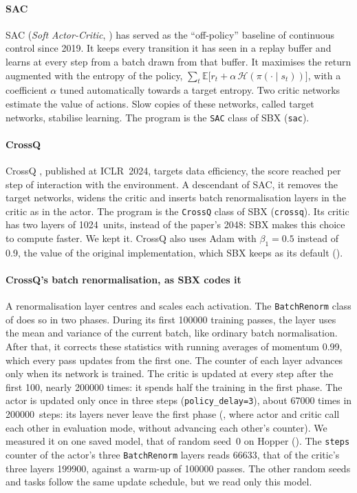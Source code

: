 \paragraph{SAC}
SAC (\emph{Soft Actor-Critic}, \cite{haarnoja2018sac}) has served as the \enquote{off-policy} baseline of
continuous control since 2019. It keeps every transition it has seen in a replay buffer and learns at every step from a
batch drawn from that buffer. It maximises the return augmented with the entropy of the policy,
$\sum_t \mathbb{E}\bigl[r_t + \alpha\,\mathcal{H}(\pi(\cdot\mid s_t))\bigr]$, with a coefficient $\alpha$
tuned automatically towards a target entropy. Two critic networks estimate the value of actions. Slow copies of
these networks, called target networks, stabilise learning. The program is the \texttt{SAC} class of SBX
(\texttt{sac}).

\paragraph{CrossQ}
CrossQ \parencite{bhatt2024crossq}, published at ICLR~2024, targets data efficiency, the score reached per step
of interaction with the environment. A descendant of SAC, it removes the target networks, widens the critic
and inserts batch renormalisation layers \parencite{ioffe2017batchrenorm} in the critic as in the actor. The
program is the \texttt{CrossQ} class of SBX (\texttt{crossq}). Its critic has two layers of \num{1024}~units,
instead of the paper's \num{2048}: SBX makes this choice to compute faster. We kept it. CrossQ also uses Adam with
$\beta_1 = 0.5$ instead of 0.9, the value of the original implementation, which SBX keeps as its default
().

\paragraph{CrossQ's batch renormalisation, as SBX codes it}
A renormalisation layer centres and scales each activation. The \texttt{BatchRenorm} class of
 does so in two phases. During its first \num{100000} training passes, the
layer uses the mean and variance of the current batch, like ordinary batch normalisation. After that, it
corrects these statistics with running averages of momentum 0.99, which every pass updates from the first
one. The counter of each
layer advances only when its network is trained. The critic is updated at every step after the first 100,
nearly \num{200000} times: it spends half the training in the first phase. The actor is updated only once in
three steps (\texttt{policy\_delay=3}), about \num{67000} times in \num{200000}~steps: its layers never leave
the first phase (, where actor and critic call each other in evaluation mode,
without advancing each other's counter). We measured it on one saved model, that of random seed~0 on Hopper
(). The \texttt{steps} counter of the actor's three
\texttt{BatchRenorm} layers reads \num{66633}, that of the critic's three layers \num{199900}, against a
warm-up of \num{100000} passes. The other random seeds and tasks follow the same update schedule, but we read
only this model.

